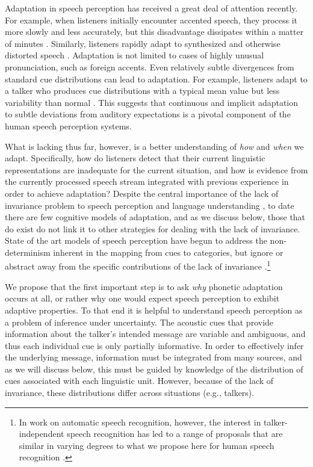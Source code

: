 Adaptation in speech perception has received a great deal of attention recently. For example, when listeners initially encounter accented speech, they process it more slowly and less accurately, but this disadvantage dissipates within a matter of minutes \autocite[][and references therein]{Bradlow2008,Clarke2004}. Similarly, listeners rapidly adapt to synthesized and otherwise distorted speech \autocite[e.g.,][]{Davis2005}. Adaptation is not limited to cases of highly unusual pronunciation, such as foreign accents. Even relatively subtle divergences from standard cue distributions can lead to adaptation.  For example, listeners adapt to a talker who produces cue distributions with a typical mean value but less variability than normal \cite{Clayards2008}.  This suggests that continuous and implicit adaptation to subtle deviations from auditory expectations is a pivotal component of the human speech perception systems.

What is lacking thus far, however, is a better understanding of \emph{how} and \emph{when} we adapt.  Specifically, how do listeners detect that their current linguistic representations are inadequate for the current situation, and how is evidence from the currently processed speech stream integrated with previous experience in order to achieve adaptation?   Despite the central importance of the lack of invariance problem to speech perception and language understanding \cite{Liberman1967,Pardo2006}, to date there are few cognitive models of adaptation, and as we discuss below, those that do exist do not link it to other strategies for dealing with the lack of invariance.  State of the art models of speech perception have begun to address the non-determinism inherent in the mapping from cues to categories, but ignore or abstract away from the specific contributions of the lack of invariance \cite{Feldman2009a,Feldman2013a,Norris2008}.\footnote{In work on automatic speech recognition, however, the interest in talker-independent speech recognition has led to a range of proposals that are similar in varying degrees to what we propose here for human speech recognition \autocite[e.g.,][]{Gauvain1994,Leggetter1995,Shinoda2001}.}

We propose that the first important step is to ask {\em why} phonetic adaptation occurs at all, or rather why one would expect speech perception to exhibit adaptive properties.
To that end it is helpful to understand speech perception as a problem of inference under uncertainty.
The acoustic cues that provide information about the talker's intended message are variable and ambiguous, and thus each individual cue is only partially informative.
In order to effectively infer the underlying message, information must be integrated from many sources, and as we will discuss below, this must be guided by knowledge of the distribution of cues associated with each linguistic unit.  However, because of the lack of invariance, these distributions differ across situations (e.g., talkers).

